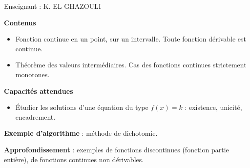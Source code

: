 \documentclass[11pt,a4paper]{article}
\newcommand{\Cf}{\mathscr{C}_f}
\begin{document}
\begin{titlepage}

\vfill
{\large Enseignant : K. EL GHAZOULI\par}
\vspace{0.6cm}
\end{titlepage}

\setcounter{page}{1}
\begingroup
\hypersetup{linkcolor=bleu}
\renewcommand{\contentsname}{Sommaire}
\tableofcontents
\endgroup

\vspace{0.8cm}

\begin{programme}
\textbf{Contenus}
\begin{itemize}
  \item Fonction continue en un point, sur un intervalle.
        Toute fonction dérivable est continue.
  \item Théorème des valeurs intermédiaires. Cas des fonctions continues
        strictement monotones.
\end{itemize}
\textbf{Capacités attendues}
\begin{itemize}
  \item Étudier les solutions d'une équation du type $f(x)=k$ :
        existence, unicité, encadrement.
\end{itemize}
\textbf{Exemple d'algorithme} : méthode de dichotomie.

\textbf{Approfondissement} : exemples de fonctions discontinues (fonction partie
entière), de fonctions continues non dérivables.
\end{programme}
\end{document}
